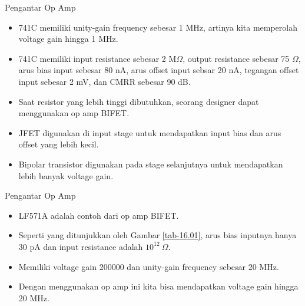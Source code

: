 \begin{frame}{Pengantar Op Amp}
	\begin{itemize}
		\item 741C memiliki unity-gain frequency sebesar 1 MHz, artinya kita memperolah voltage gain hingga 1 MHz.
		\item 741C memiliki input resistance sebesar 2 M$ \Omega $, output resistance sebesar 75 $\Omega$, arus bias input sebesar 80 nA, arus offset input sebsar 20 nA, tegangan offset input sebesar 2 mV, dan CMRR sebesar 90 dB.
		\item Saat resistor yang lebih tinggi dibutuhkan, seorang designer dapat menggunakan op amp BIFET.
		\item JFET digunakan di input stage untuk mendapatkan input bias dan arus offset yang lebih kecil.
		\item Bipolar transistor digunakan pada stage selanjutnya untuk mendapatkan lebih banyak voltage gain.
	\end{itemize}
\end{frame}

\begin{frame}{Pengantar Op Amp}
	\begin{itemize}
		\item LF571A adalah contoh dari op amp BIFET.
		\item Seperti yang ditunjukkan oleh Gambar \ref{tab-16.01}, arus bias inputnya hanya 30 pA dan input resistance adalah $ 10^{12} ~\Omega$.
		\item Memiliki voltage gain 200000 dan unity-gain frequency sebesar 20 MHz.
		\item Dengan menggunakan op amp ini kita bisa mendapatkan voltage gain hingga 20 MHz.
	\end{itemize}
\end{frame}